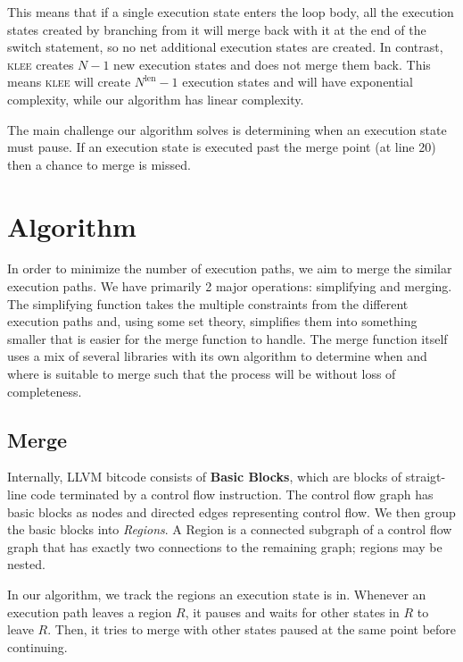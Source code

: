 \documentclass[12pt,a4paper]{article}
\begin{document}
This means that if a single execution state enters the loop body, all the execution states created by branching from it will merge back with it at the end of the switch statement, so no net additional execution states are created. In contrast, \textsc{klee} creates $N-1$ new execution states and does not merge them back. This means \textsc{klee} will create $N^\text{len} - 1$ execution states and will have exponential complexity, while our algorithm has linear complexity.

The main challenge our algorithm solves is determining when an execution state must pause. If an execution state is executed past the merge point (at line 20) then a chance to merge is missed.

\section{Algorithm}\label{algorithm}
In order to minimize the number of execution paths, we aim to merge the similar execution paths. We have primarily 2 major operations: simplifying and merging. The simplifying function takes the multiple constraints from the different execution paths and, using some set theory, simplifies them into something smaller that is easier for the merge function to handle. The merge function itself uses a mix of several libraries with its own algorithm to determine when and where is suitable to merge such that the process will be without loss of completeness.

\subsection{Merge}
Internally, LLVM bitcode consists of \textbf{Basic Blocks}, which are blocks of straigt-line code terminated by a control flow instruction. The control flow graph has basic blocks as nodes and directed edges representing control flow. We then group the basic blocks into \emph{Regions}. A Region is a connected subgraph of a control flow graph that has exactly two connections to the remaining graph; regions may be nested. 

In our algorithm, we track the regions an execution state is in. Whenever an execution path leaves a region $R$, it pauses and waits for other states in $R$ to leave $R$. Then, it tries to merge with other states paused at the same point before continuing.

\end{document}
